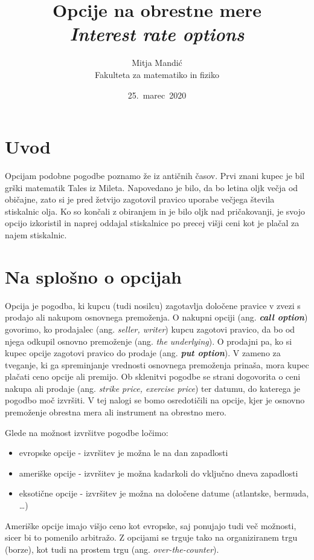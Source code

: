 \documentclass[a4paper]{article}
\title{Opcije na obrestne mere\\
    \textit{Interest rate options}}
\author{Mitja Mandić \\ Fakulteta za matematiko in fiziko}
\date{25.\ marec\ 2020}
\begin{document}
\begin{titlepage}
    \maketitle
    \thispagestyle{empty}
\end{titlepage}

\pagebreak
\tableofcontents
\pagebreak

\section{Uvod}
Opcijam podobne pogodbe poznamo že iz antičnih časov. Prvi znani kupec je bil grški matematik Tales iz Mileta.
Napovedano je bilo, da bo letina oljk večja od običajne, zato si je pred žetvijo zagotovil pravico uporabe večjega
števila stiskalnic olja. Ko so končali z obiranjem in je bilo oljk nad pričakovanji, je svojo opcijo izkoristil in naprej oddajal
stiskalnice po precej višji ceni kot je plačal za najem stiskalnic.

\section{Na splošno o opcijah}

Opcija je pogodba, ki kupcu (tudi nosilcu) zagotavlja določene pravice v zvezi s prodajo ali nakupom osnovnega premoženja.
O nakupni opciji (ang. \textbf{\textit{call option}}) govorimo, ko prodajalec (ang. \textit{seller, writer}) kupcu zagotovi pravico,
da bo od njega odkupil osnovno premoženje (ang. \textit{the underlying}). O prodajni pa, ko si kupec opcije zagotovi 
pravico do prodaje (ang. \textit{\textbf{put option}}).
V zameno za tveganje, ki ga spreminjanje vrednosti osnovnega premoženja prinaša, 
mora kupec plačati ceno opcije ali premijo. Ob sklenitvi pogodbe se strani dogovorita o ceni nakupa ali prodaje
(ang. \textit{strike price, exercise price}) ter datumu, do katerega je pogodbo moč izvršiti.
V tej nalogi se bomo osredotičili na opcije, kjer je osnovno premoženje obrestna mera ali instrument na obrestno mero. 

Glede na možnost izvršitve pogodbe ločimo:
\begin{itemize}
    \item evropske opcije - izvršitev je možna le na dan zapadlosti
    \item ameriške opcije - izvršitev je možna kadarkoli do vključno dneva zapadlosti
    \item eksotične opcije - izvršitev je možna na določene datume (atlantske, bermuda, \ldots)
\end{itemize}
Ameriške opcije imajo višjo ceno kot evropske, saj ponujajo tudi več možnosti, sicer bi to pomenilo arbitražo.
Z opcijami se trguje tako na organiziranem trgu (borze), kot tudi na prostem trgu (ang. \textit{over-the-counter}).
\end{document}
